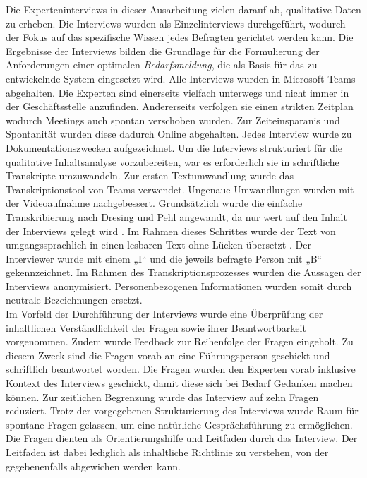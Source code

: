 Die Experteninterviews in dieser Ausarbeitung zielen darauf ab, qualitative Daten zu erheben. Die Interviews wurden als Einzelinterviews durchgeführt, wodurch der Fokus auf das spezifische Wissen jedes Befragten gerichtet werden kann. Die Ergebnisse der Interviews bilden die Grundlage für die Formulierung der Anforderungen einer optimalen \emph{Bedarfsmeldung}, die als Basis für das zu entwickelnde System eingesetzt wird. Alle Interviews wurden in Microsoft Teams abgehalten. Die Experten sind einerseits vielfach unterwegs und nicht immer in der Geschäftsstelle anzufinden. Andererseits verfolgen sie einen strikten Zeitplan wodurch Meetings auch spontan verschoben wurden. Zur Zeiteinsparanis und Spontanität wurden diese dadurch Online abgehalten. Jedes Interview wurde zu Dokumentationszwecken aufgezeichnet. Um die Interviews strukturiert für die qualitative Inhaltsanalyse vorzubereiten, war es erforderlich sie in schriftliche Transkripte umzuwandeln. Zur ersten Textumwandlung wurde das Transkriptionstool von Teams verwendet. Ungenaue Umwandlungen wurden mit der Videoaufnahme nachgebessert. Grundsätzlich wurde die einfache Transkribierung nach Dresing und Pehl angewandt, da nur wert auf den Inhalt der Interviews gelegt wird \cite{dresing2015praxisbuch}. Im Rahmen dieses Schrittes wurde der Text von umgangssprachlich in einen lesbaren Text ohne Lücken übersetzt \cite{dresing2015praxisbuch}. Der Interviewer wurde mit einem „I“ und die jeweils befragte Person mit „B“ gekennzeichnet. Im Rahmen des Transkriptionsprozesses wurden die Aussagen der Interviews anonymisiert. Personenbezogenen Informationen wurden somit durch neutrale Bezeichnungen ersetzt.\\

Im Vorfeld der Durchführung der Interviews wurde eine Überprüfung der inhaltlichen Verständlichkeit der Fragen sowie ihrer Beantwortbarkeit vorgenommen. Zudem wurde Feedback zur Reihenfolge der Fragen eingeholt. Zu diesem Zweck sind die Fragen vorab an eine Führungsperson geschickt und schriftlich beantwortet worden. Die Fragen wurden den Experten vorab inklusive Kontext des Interviews geschickt, damit diese sich bei Bedarf Gedanken machen können. Zur zeitlichen Begrenzung wurde das Interview auf zehn Fragen reduziert. Trotz der vorgegebenen Strukturierung des Interviews wurde Raum für spontane Fragen gelassen, um eine natürliche Gesprächsführung zu ermöglichen. Die Fragen dienten als Orientierungshilfe und Leitfaden durch das Interview. Der Leitfaden ist dabei lediglich als inhaltliche Richtlinie zu verstehen, von der gegebenenfalls abgewichen werden kann.
